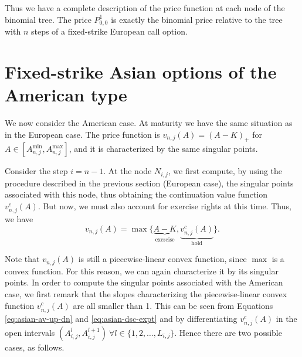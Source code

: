 Thus we have a complete description of the price function at each node of the binomial tree. The price $ P_{0,0}^1 $ is exactly the binomial price relative to the tree with $n$ steps of a fixed-strike European call option.


\section{Fixed-strike Asian options of the American type}
\label{sec:fixed-strike-am}

We now consider the American case. At maturity we have the same situation as in the European case. The price function is $ v_{n,j} (A) = (A - K)_+ $ for $ A \in [ A_{n,j}^{\min}, A_{n,j}^{\max} ] $, and it is characterized by the same singular points.

Consider the step $ i = n - 1 $. At the node $ N_{i,j} $, we first compute, by using the procedure described in the previous section (European case), the singular points associated with this node, thus obtaining the continuation value function $ v_{n,j}^c (A) $. But now, we must also account for exercise rights at this time. Thus, we have
\begin{equation}
	v_{n,j} (A)  =  \max \{ \underbrace{A - K}_{\text{exercise}}, \underbrace{v_{n,j}^c (A)}_{\text{hold}} \} .
\end{equation}

Note that $ v_{n,j} (A) $ is still a piecewise-linear convex function, since $ \max $ is a convex function. For this reason, we can again characterize it by its singular points. In order to compute the singular points associated with the American case, we first remark that the slopes characterizing the piecewise-linear convex function $ v_{n,j}^c (A) $ are all smaller than 1. This can be seen from Equations \ref{eq:asian-av-up-dn} and \ref{eq:asian-dsc-expt} and by differentiating $ v_{n,j}^c (A) $ in the open intervals $ \left(  A_{i,j}^{l}, A_{i,j}^{l+1}  \right)  \  \forall l \in \{ 1, 2, \dots, L_{i,j} \} $. Hence there are two possible cases, as follows.

